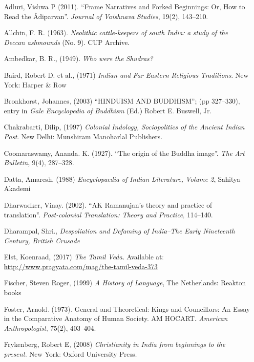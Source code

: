 \begin{thebibliography}{99}
 Adluri, Vishwa P (2011). “Frame Narratives and Forked Beginnings: Or, How to Read the Ådiparvan”. \textit{Journal of Vaishnava Studies}, 19(2), 143–210.

  Allchin, F. R. (1963). \textit{Neolithic cattle-keepers of south India: a study of the Deccan ashmounds} (No. 9). CUP Archive.

  Ambedkar, B. R., (1949). \textit{Who were the Shudras?}

  Baird, Robert D. et al., (1971) \textit{Indian and Far Eastern Religious Traditions}. New York: Harper \& Row

  Bronkhorst, Johannes, (2003) “HINDUISM AND BUDDHISM”; (pp 327–330), entry in \textit{Gale Encyclopedia of Buddhism} (Ed.) Robert E. Buswell, Jr.

  Chakrabarti, Dilip, (1997) \textit{Colonial Indology, Sociopolitics of the Ancient Indian Past}. New Delhi: Munshiram Manoharlal Publishers.

  Coomaraswamy, Ananda. K. (1927). “The origin of the Buddha image”. \textit{The Art Bulletin}, 9(4), 287–328.

  Datta, Amaresh, (1988) \textit{Encyclopaedia of Indian Literature, Volume 2}, Sahitya Akademi

  Dharwadker, Vinay. (2002). “AK Ramanujan’s theory and practice of translation”. \textit{Post-colonial Translation: Theory and Practice}, 114–140.

  Dharampal, Shri., \textit{Despoliation and Defaming of India–The Early Nineteenth Century, British Crusade}

  Elst, Koenraad, (2017) \textit{The Tamil Veda}. Available at: \url{http://www.pragyata.com/mag/the-tamil-veda-373}

  Fischer, Steven Roger, (1999) \textit{A History of Language}, The Netherlands: Reakton books

  Foster, Arnold. (1973). General and Theoretical: Kings and Councillors: An Essay in the Comparative Anatomy of Human Society. AM HOCART. \textit{American Anthropologist}, 75(2), 403–404.

  Frykenberg, Robert E, (2008) \textit{Christianity in India from beginnings to the present}. New York: Oxford University Press.


\end{thebibliography}
